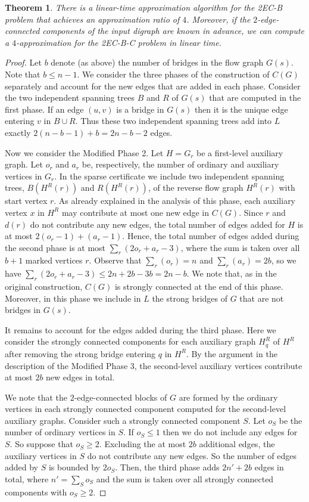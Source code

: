 \documentclass[11pt]{article}
\newtheorem{theorem}{Theorem}[section]
\begin{document}
\begin{theorem}
\label{theorem:ApproximationRatio}
There is a linear-time approximation algorithm for the \textsf{2EC-B} problem that achieves an approximation ratio of $4$.
Moreover, if the $2$-edge-connected components of the input digraph are known in advance, we can compute a $4$-approximation for the \textsf{2EC-B-C} problem in linear time.
\end{theorem}
\begin{proof}
Let $b$ denote (as above)  the number of bridges in the flow graph $G(s)$. Note that $b \le n-1$.
We consider the three phases of the construction of $C(G)$ separately and account for the new edges that are added in each phase.
Consider the two independent spanning trees $B$ and $R$ of $G(s)$ that are computed in the first phase. If an edge $(u,v)$ is a bridge in $G(s)$ then it is the unique edge entering $v$ in $B \cup R$. Thus these two independent spanning trees add into $L$ exactly $2(n-b-1)+b=2n-b-2$ edges.

Now we consider the Modified Phase 2. Let $H=G_r$ be a first-level auxiliary graph. Let $o_r$ and $a_r$ be, respectively, the number of ordinary and auxiliary vertices in $G_r$.
In the sparse certificate we include two independent spanning trees, $B(H^R(r))$ and $R(H^R(r))$, of the reverse flow graph $H^R(r)$ with start vertex $r$.
As already explained in the analysis of this phase, each auxiliary vertex $x$ in $H^R$ may contribute at most one new edge in $C(G)$.
Since $r$ and $d(r)$ do not contribute any new edges, the total number of edges added for $H$ is at most $2(o_r-1)+(a_r-1)$. Hence, the total number of edges added during the second phase is at most $\sum_{r}(2o_r+a_r-3)$, where the sum is taken over all $b+1$ marked vertices $r$. Observe that $\sum_r (o_r) = n$ and $\sum_r (a_r) = 2b$, so we have $\sum_{r}(2o_r+a_r-3) \le 2n + 2b -3b = 2n -b$.
We note that, as in the original construction, $C(G)$ is strongly connected at the end of this phase. Moreover, in this phase we include in $L$ the strong bridges of $G$ that are not bridges in $G(s)$.

It remains to account for the edges added during the third phase.
Here we consider the strongly connected components for each auxiliary graph $H_q^R$ of $H^R$ after removing the strong bridge entering $q$ in $H^R$.
By the argument in the description of the Modified Phase 3, the second-level auxiliary vertices contribute at most $2b$ new edges in total.

We note that the $2$-edge-connected blocks of $G$ are formed by the ordinary vertices in each strongly connected component computed for the second-level auxiliary graphs.
Consider such a strongly connected component $S$. Let $o_S$ be the number of ordinary vertices in $S$. If $o_S \le 1$ then we do not include any edges for $S$. So suppose that $o_S \ge 2$.
Excluding the at most $2b$ additional edges, the auxiliary vertices in $S$ do not contribute any new edges. So the number of edges added by $S$ is bounded by $2o_S$.
Then, the third phase adds $2n'+2b$ edges in total, where $n'=\sum_S o_S$ and the sum is taken over all strongly connected components with $o_S \ge 2$.


\end{proof}
\end{document}
